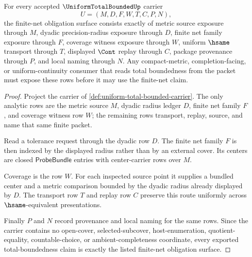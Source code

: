 \begin{theorem}
\label{thm:uniform-total-bounded-finite-net-obligation}
For every accepted $\UniformTotalBoundedUp$ carrier
$$
U=(M,D,F,W,T,C,P,N),
$$
the finite-net obligation surface consists exactly of metric source exposure through $M$, dyadic precision-radius exposure through $D$, finite net family exposure through $F$, coverage witness exposure through $W$, uniform $\hsame$ transport through $T$, displayed $\Cont$ replay through $C$, package provenance through $P$, and local naming through $N$. Any compact-metric, completion-facing, or uniform-continuity consumer that reads total boundedness from the packet must expose these rows before it may use the finite-net claim.
\end{theorem}
\begin{proof}
Project the carrier of \autoref{def:uniform-total-bounded-carrier}. The only analytic rows are the metric source $M$, dyadic radius ledger $D$, finite net family $F$, and coverage witness row $W$; the remaining rows transport, replay, source, and name that same finite packet.

Read a tolerance request through the dyadic row $D$. The finite net family $F$ is then indexed by the displayed radius rather than by an external cover. Its centers are closed $\mathsf{ProbeBundle}$ entries with center-carrier rows over $M$.

Coverage is the row $W$. For each inspected source point it supplies a bundled center and a metric comparison bounded by the dyadic radius already displayed by $D$. The transport row $T$ and replay row $C$ preserve this route uniformly across $\hsame$-equivalent presentations.

Finally $P$ and $N$ record provenance and local naming for the same rows. Since the carrier contains no open-cover, selected-subcover, host-enumeration, quotient-equality, countable-choice, or ambient-completeness coordinate, every exported total-boundedness claim is exactly the listed finite-net obligation surface.
\end{proof}


